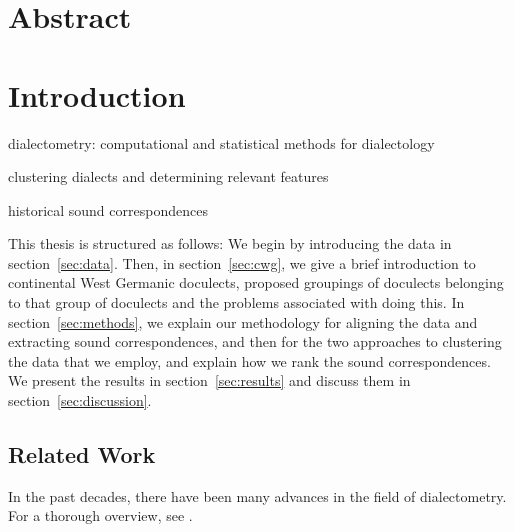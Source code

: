 \documentclass[a4paper]{article}
\begin{document}
\newpage
\section*{Abstract}

\vspace{2em}
\newpage
\tableofcontents
\newpage
\listoftables
\listoffigures
\newpage



\section{Introduction}


dialectometry: computational and statistical methods for dialectology

clustering dialects and determining relevant features

historical sound correspondences


This thesis is structured as follows:
We begin by introducing the data in section~\ref{sec:data}.
Then, in section~\ref{sec:cwg},
we give a brief introduction to continental West Germanic doculects,
proposed groupings of doculects belonging to that group of doculects
and the problems associated with doing this.
In section~\ref{sec:methods}, we explain our methodology for
aligning the data and extracting sound correspondences,
and then for the two approaches to clustering the data that we employ,
and explain how we rank the sound correspondences.
We present the results in section~\ref{sec:results}
and discuss them in section~\ref{sec:discussion}.

\subsection{Related Work}

In the past decades, there have been many advances in the field of dialectometry.
For a thorough overview, see \citet{wieling2015advances}.
\end{document}
